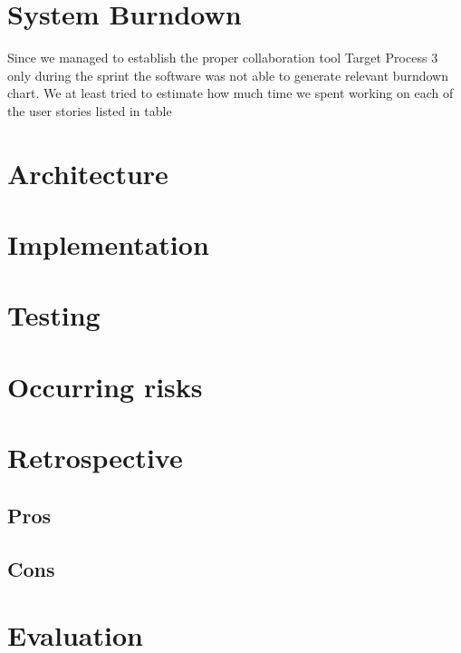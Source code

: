 \section{System Burndown}
Since we managed to establish the proper collaboration tool Target Process 3 only during the sprint the software was not able to generate relevant burndown chart. We at least tried to estimate how much time we spent working on each of the user stories listed in table



\section{Architecture}
\section{Implementation}
\section{Testing}
\section{Occurring risks}
\section{Retrospective}
\subsection{Pros}
\subsection{Cons}
\section{Evaluation}